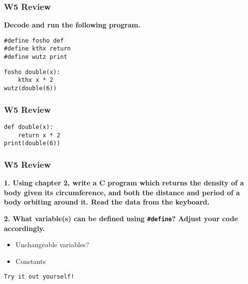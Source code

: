 \documentclass[
	11pt, %
]{beamer}
\begin{document}

\begin{frame}
    \frametitle{W5 Review}
    \textbf{Decode and run the following program.}
    \vspace{0.5em}

    \texttt{\#define fosho def} \\
    \texttt{\#define kthx return} \\
    \texttt{\#define wutz print} \\

	\bigskip

    \texttt{fosho double(x):} \\
    \texttt{\ \ \ \ kthx x * 2} \\

    \texttt{wutz(double(6))}
\end{frame}


\begin{frame}
    \frametitle{W5 Review}
    \texttt{def double(x):} \\
    \texttt{~~~~return x * 2} \\

    \texttt{print(double(6))}
\end{frame}


\begin{frame}
    \frametitle{W5 Review}
    \textbf{1. Using chapter 2, write a C program which returns the density of a body given its circumference, and both the distance and period of a body orbiting around it. Read the data from the keyboard.}

\smallskip

    \textbf{2. What variable(s) can be defined using \texttt{\#define}? Adjust your code accordingly.}
    \begin{itemize}
        \item Unchangeable variables?
        \item Constants
    \end{itemize}

    \smallskip
    \texttt{Try it out yourself!}
\end{frame}

\end{document}
